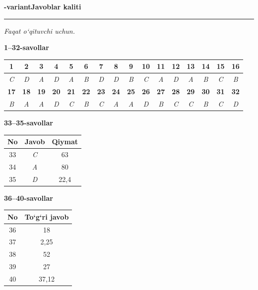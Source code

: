 \documentclass[11pt,a4paper]{article}
\begin{document}
\newpage
\noindent\textbf{\fontsize{13}{15}-variant}\hfill \textbf{Javoblar kaliti}\par\smallskip\hrule\smallskip
\textit{Faqat o`qituvchi uchun.}\par\medskip
\noindent\textbf{1--32-savollar}\par\smallskip
\noindent\begin{tabular}{|c|c|c|c|c|c|c|c|c|c|c|c|c|c|c|c|}\hline
\textbf{1} & \textbf{2} & \textbf{3} & \textbf{4} & \textbf{5} & \textbf{6} & \textbf{7} & \textbf{8} & \textbf{9} & \textbf{10} & \textbf{11} & \textbf{12} & \textbf{13} & \textbf{14} & \textbf{15} & \textbf{16}\\\hline
\textsl{C} & \textsl{D} & \textsl{A} & \textsl{D} & \textsl{A} & \textsl{B} & \textsl{D} & \textsl{D} & \textsl{B} & \textsl{C} & \textsl{A} & \textsl{D} & \textsl{A} & \textsl{B} & \textsl{C} & \textsl{B}\\\hline
\textbf{17} & \textbf{18} & \textbf{19} & \textbf{20} & \textbf{21} & \textbf{22} & \textbf{23} & \textbf{24} & \textbf{25} & \textbf{26} & \textbf{27} & \textbf{28} & \textbf{29} & \textbf{30} & \textbf{31} & \textbf{32}\\\hline
\textsl{B} & \textsl{A} & \textsl{A} & \textsl{D} & \textsl{C} & \textsl{B} & \textsl{C} & \textsl{A} & \textsl{A} & \textsl{D} & \textsl{B} & \textsl{C} & \textsl{C} & \textsl{B} & \textsl{C} & \textsl{D}\\\hline
\end{tabular}\par\medskip
\noindent\textbf{33--35-savollar}\par\smallskip
\noindent\begin{tabular}{|c|c|c|}\hline \textbf{No} & \textbf{Javob} & \textbf{Qiymat}\\\hline
33 & \textsl{C} & 63\\\hline
34 & \textsl{A} & 80\\\hline
35 & \textsl{D} & 22,4\\\hline
\end{tabular}\par\medskip
\noindent\textbf{36--40-savollar}\par\smallskip
\noindent\begin{tabular}{|c|c|}\hline \textbf{No} & \textbf{To`g`ri javob}\\\hline
36 & 18\\\hline
37 & 2,25\\\hline
38 & 52\\\hline
39 & 27\\\hline
40 & 37,12\\\hline
\end{tabular}\par\medskip
\end{document}
